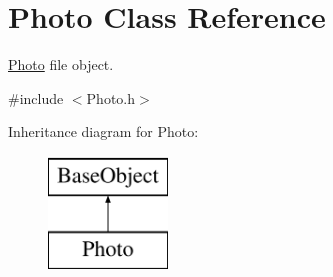 \hypertarget{classPhoto}{\section{Photo Class Reference}
\label{classPhoto}
}


\hyperlink{classPhoto}{Photo} file object.  




{\ttfamily \#include $<$Photo.\+h$>$}

Inheritance diagram for Photo\+:\begin{figure}[H]
\begin{center}
\leavevmode
\includegraphics[height=3.000000cm]{classPhoto}
\end{center}
\end{figure}
